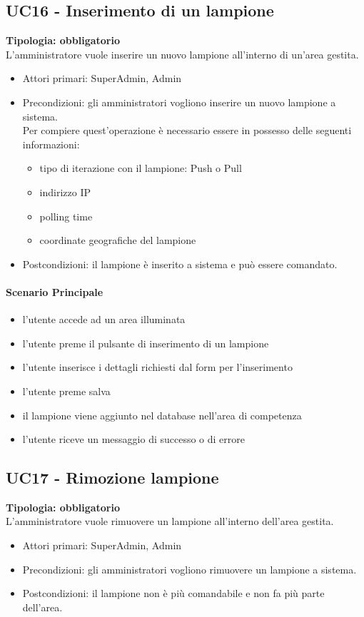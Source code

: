 \documentclass[12pt]{article}
\begin{document}
\subsection{UC16 - Inserimento di un lampione}
\textbf{Tipologia: obbligatorio}\\
L'amministratore vuole inserire un nuovo lampione all'interno di un'area gestita.
\begin{itemize}
	\item Attori primari: SuperAdmin, Admin
	\item Precondizioni: gli amministratori vogliono inserire un nuovo lampione a sistema.\\
	 Per compiere quest'operazione è necessario essere in possesso delle seguenti informazioni: 
	\begin{itemize}
		\item tipo di iterazione con il lampione: Push o Pull
		\item indirizzo IP
		\item polling time
		\item coordinate geografiche del lampione
	\end{itemize}
	\item Postcondizioni: il lampione è inserito a sistema e può essere comandato.
\end{itemize}
\paragraph{Scenario Principale}
\begin{itemize}
	\item l'utente accede ad un area illuminata
	\item l'utente preme il pulsante di inserimento di un lampione
	\item l'utente inserisce i dettagli richiesti dal form per l'inserimento
	\item l'utente preme salva
	\item il lampione viene aggiunto nel database nell'area di competenza
	\item l'utente riceve un messaggio di successo o di errore
\end{itemize}


\subsection{UC17 - Rimozione lampione}
\textbf{Tipologia: obbligatorio}\\
L'amministratore vuole rimuovere un lampione all'interno dell'area gestita.
\begin{itemize}
	\item Attori primari: SuperAdmin, Admin
	\item Precondizioni: gli amministratori vogliono rimuovere un lampione a sistema.\\
	\item Postcondizioni: il lampione non è più comandabile e non fa più parte dell'area.
\end{itemize}
\end{document}
